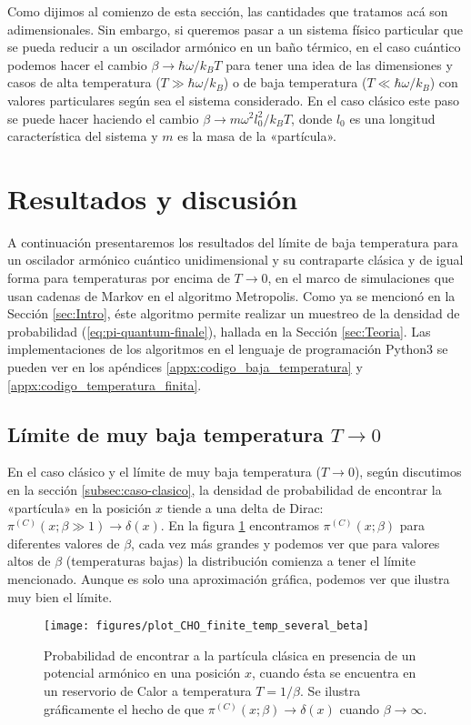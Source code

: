 \documentclass[%
 reprint,
 amsmath,amssymb,
 aps,
 pra,
]{revtex4-2}
\begin{document}
Como dijimos al comienzo de esta sección, las cantidades que tratamos acá son adimensionales. Sin embargo, si queremos pasar a un sistema físico particular que se pueda reducir a un oscilador armónico en un baño térmico, en el caso cuántico podemos hacer el cambio $\beta\rightarrow\hbar\omega / k_B T$ para tener una idea de las dimensiones y casos de alta temperatura  ($T \gg \hbar\omega / k_B$) o de baja temperatura ($T \ll \hbar\omega / k_B$) con valores particulares según sea el sistema considerado. En el caso clásico este paso se puede hacer haciendo el cambio $\beta \rightarrow m\omega^2l_0^2/k_B T$, donde $l_0$ es una longitud característica del sistema y $m$ es la masa de la «partícula».


\section{\label{sec:Resultados}Resultados y discusión}
A continuación presentaremos los resultados del límite de baja temperatura para un oscilador armónico cuántico unidimensional y su contraparte clásica y de igual forma para temperaturas por encima de $T \rightarrow 0$, en el marco de simulaciones que usan cadenas de Markov en el algoritmo Metropolis. Como ya se mencionó en la Sección \ref{sec:Intro}, éste algoritmo permite realizar un muestreo de la densidad de probabilidad (\ref{eq:pi-quantum-finale}), hallada en la Sección \ref{sec:Teoria}. Las implementaciones de los algoritmos en el lenguaje de programación Python3 se pueden ver en los apéndices \ref{appx:codigo_baja_temperatura} y \ref{appx:codigo_temperatura_finita}.

\subsection{Límite de muy baja temperatura \texorpdfstring{$T \rightarrow 0$}{T tendiendo a cero}\label{subsec:limite-T-0}}

En el caso clásico y el límite de muy baja temperatura ($T \rightarrow 0 $), según discutimos en la sección \ref{subsec:caso-clasico}, la densidad de probabilidad de encontrar la «partícula» en la posición $x$ tiende a una delta de Dirac: $\pi^{(C)}(x;\beta \gg 1) \rightarrow \delta(x)$. En la figura \ref{fig:classic_probability} encontramos $\pi^{(C)}(x;\beta)$ para diferentes valores de $\beta$, cada vez más grandes y podemos ver que para valores altos de $\beta$ (temperaturas bajas) la distribución comienza a tener el límite mencionado. Aunque es solo una aproximación gráfica, podemos ver que ilustra muy bien el límite.
\begin{figure}[!t]
	\centering
	\texttt{[image: figures/plot\_CHO\_finite\_temp\_several\_beta]}
	\caption{Probabilidad de encontrar a la partícula clásica en presencia de un potencial armónico en una posición $x$, cuando ésta se encuentra en un reservorio de Calor a temperatura $T=1/\beta$. Se ilustra gráficamente el hecho de que $\pi^{(C)}(x;\beta) \rightarrow \delta(x)$ cuando $\beta\rightarrow\infty$.}
	\label{fig:classic_probability}
\end{figure}
\end{document}
